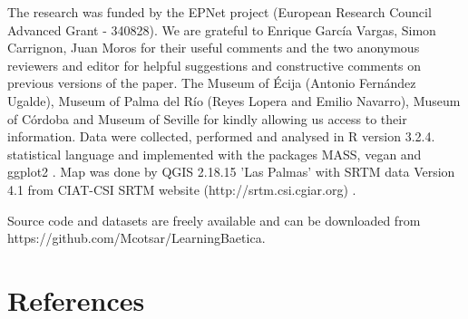 \documentclass[review]{elsarticle}
\begin{document}
The research was funded by the EPNet project (European Research Council Advanced Grant - 340828). We are grateful to Enrique Garc\'ia Vargas, Simon Carrignon, Juan Moros for their useful comments and the two anonymous reviewers and editor for helpful suggestions and constructive comments on previous versions of the paper. The Museum of \'Ecija (Antonio Fern\'andez Ugalde), Museum of Palma del R\'io (Reyes Lopera and Emilio Navarro), Museum of C\'ordoba and Museum of Seville for kindly allowing us access to their information. Data were collected, performed and analysed in R version 3.2.4. statistical language and implemented with the packages MASS, vegan and ggplot2 \citep{ripley_package_2013,oksanen_vegan_2007,ggplot2:_2016}. Map was done by QGIS 2.18.15 'Las Palmas' with SRTM data Version 4.1 from CIAT-CSI SRTM website (http://srtm.csi.cgiar.org) \citep{SRTM}. 

Source code and datasets are freely available and can be downloaded from https://github.com/Mcotsar/LearningBaetica.  

\section*{References}


\end{document}

